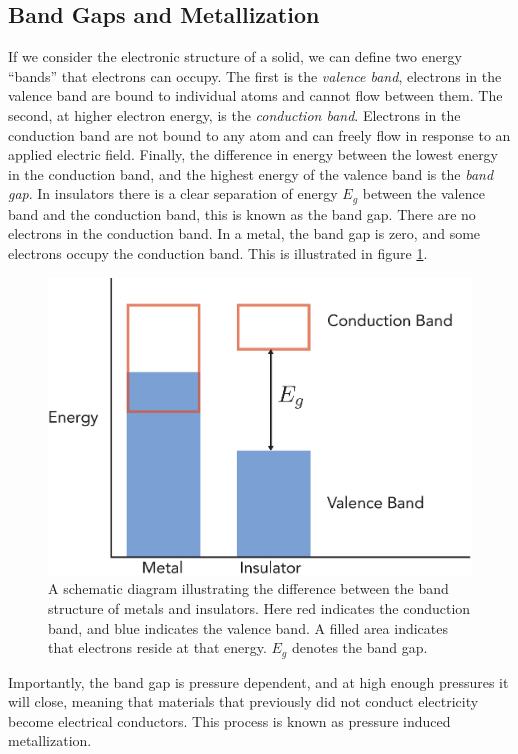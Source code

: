 \subsection{Band Gaps and Metallization}
If we consider the electronic structure of a solid, we can define two energy ``bands'' that electrons can occupy. The first is the \emph{valence band}, electrons in the valence band are bound to individual atoms and cannot flow between them. The second, at higher electron energy, is the \emph{conduction band}. Electrons in the conduction band are not bound to any atom and can freely flow in response to an applied electric field. Finally, the difference in energy between the lowest energy in the conduction band, and the highest energy of the valence band is the \emph{band gap}. In insulators there is a clear separation of energy $E_g$ between the valence band and the conduction band, this is known as the band gap. There are no electrons in the conduction band. In a metal, the band gap is zero, and some electrons occupy the conduction band. This is illustrated in figure \ref{fig:bandgap}.
\begin{figure}
	\centering
        \includegraphics[width=.6\textwidth]{Chapter3/Figures/EnergyGap.eps}
        \caption{A schematic diagram illustrating the difference between the band structure of metals and insulators. Here red indicates the conduction band, and blue indicates the valence band. A filled area indicates that electrons reside at that energy. $E_g$ denotes the band gap.}
        \label{fig:bandgap}
\end{figure}
Importantly, the band gap is pressure dependent, and at high enough pressures it will close, meaning that materials that previously did not conduct electricity become electrical conductors. This process is known as pressure induced metallization.

